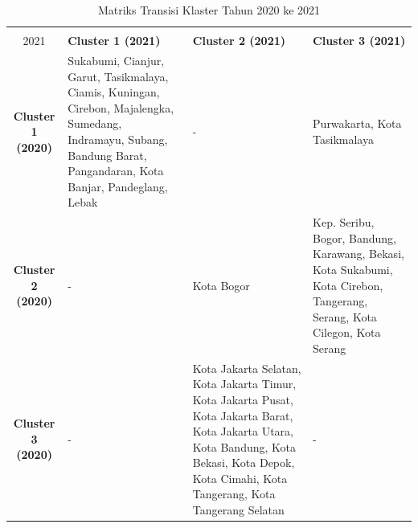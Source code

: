 \begin{table}[H]
\centering
\caption{Matriks Transisi Klaster Tahun 2020 ke 2021} \label{tab:transisi_2020_2021}
\begin{tabular}{|c|p{2cm}|p{2cm}|p{2cm}|}
\hline
\textbf{Tahun 2020 \\ 2021} & \textbf{Cluster 1 (2021)} & \textbf{Cluster 2 (2021)} & \textbf{Cluster 3 (2021)} \\ \hline
\textbf{Cluster 1 (2020)} & Sukabumi, Cianjur, Garut, Tasikmalaya, Ciamis, Kuningan, Cirebon, Majalengka, Sumedang, Indramayu, Subang, Bandung Barat, Pangandaran, Kota Banjar, Pandeglang, Lebak & - & Purwakarta, Kota Tasikmalaya \\ \hline
\textbf{Cluster 2 (2020)} & - & Kota Bogor & Kep. Seribu, Bogor, Bandung, Karawang, Bekasi, Kota Sukabumi, Kota Cirebon, Tangerang, Serang, Kota Cilegon, Kota Serang \\ \hline
\textbf{Cluster 3 (2020)} & - & Kota Jakarta Selatan, Kota Jakarta Timur, Kota Jakarta Pusat, Kota Jakarta Barat, Kota Jakarta Utara, Kota Bandung, Kota Bekasi, Kota Depok, Kota Cimahi, Kota Tangerang, Kota Tangerang Selatan & - \\ \hline
\end{tabular}
\end{table}